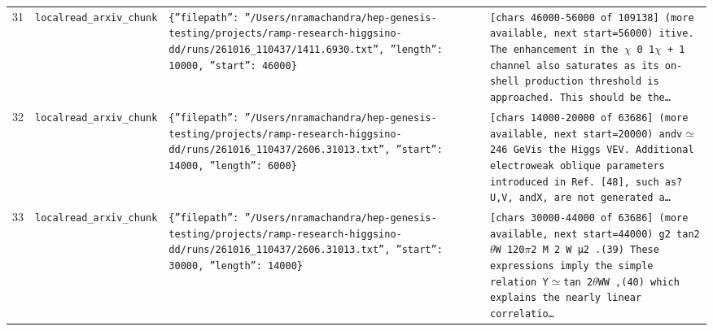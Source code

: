 \documentclass[11pt,a4paper]{article}
\begin{document}
\begin{longtable}{@{}p{}p{}p{}p{}@{}}
31 & \texttt{local}\newline\texttt{read\_\allowbreak{}arxiv\_\allowbreak{}chunk} & \texttt{\{''filepath'':\allowbreak{} ''/\allowbreak{}Users/\allowbreak{}nramachandra/\allowbreak{}hep-genesis-testing/\allowbreak{}projects/\allowbreak{}ramp-research-higgsino-dd/\allowbreak{}runs/\allowbreak{}261016\_\allowbreak{}110437/\allowbreak{}1411.6930.txt'',\allowbreak{} ''length'':\allowbreak{} 10000,\allowbreak{} ''start'':\allowbreak{} 46000\}\allowbreak{}} & \texttt{[chars 46000-56000 of 109138]\allowbreak{} (more available,\allowbreak{} next start=\allowbreak{}56000)\allowbreak{}  itive. The enhancement in the $\chi$ 0 1$\chi$ + 1 channel also saturates as its on-shell production threshold is approached. This should be the\ldots{}\allowbreak{}} \\
32 & \texttt{local}\newline\texttt{read\_\allowbreak{}arxiv\_\allowbreak{}chunk} & \texttt{\{''filepath'':\allowbreak{} ''/\allowbreak{}Users/\allowbreak{}nramachandra/\allowbreak{}hep-genesis-testing/\allowbreak{}projects/\allowbreak{}ramp-research-higgsino-dd/\allowbreak{}runs/\allowbreak{}261016\_\allowbreak{}110437/\allowbreak{}2606.31013.txt'',\allowbreak{} ''start'':\allowbreak{} 14000,\allowbreak{} ''length'':\allowbreak{} 6000\}\allowbreak{}} & \texttt{[chars 14000-20000 of 63686]\allowbreak{} (more available,\allowbreak{} next start=\allowbreak{}20000)\allowbreak{}  andv$\simeq$246 GeVis the Higgs VEV. Additional electroweak oblique parameters introduced in Ref. [48]\allowbreak{},\allowbreak{} such as?U,\allowbreak{}V,\allowbreak{} andX,\allowbreak{} are not generated a\ldots{}\allowbreak{}} \\
33 & \texttt{local}\newline\texttt{read\_\allowbreak{}arxiv\_\allowbreak{}chunk} & \texttt{\{''filepath'':\allowbreak{} ''/\allowbreak{}Users/\allowbreak{}nramachandra/\allowbreak{}hep-genesis-testing/\allowbreak{}projects/\allowbreak{}ramp-research-higgsino-dd/\allowbreak{}runs/\allowbreak{}261016\_\allowbreak{}110437/\allowbreak{}2606.31013.txt'',\allowbreak{} ''start'':\allowbreak{} 30000,\allowbreak{} ''length'':\allowbreak{} 14000\}\allowbreak{}} & \texttt{[chars 30000-44000 of 63686]\allowbreak{} (more available,\allowbreak{} next start=\allowbreak{}44000)\allowbreak{}  g2 tan2$\theta$W 120$\pi$2 M 2 W µ2 .(39)\allowbreak{} These expressions imply the simple relation Y$\simeq$tan 2$\theta$WW ,\allowbreak{}(40)\allowbreak{} which explains the nearly linear correlatio\ldots{}\allowbreak{}} \\

\end{longtable}
\end{document}
